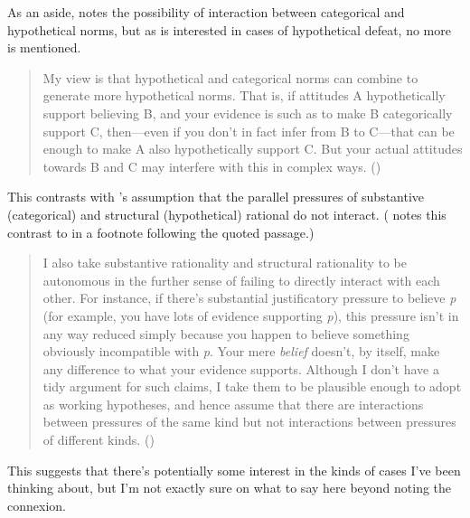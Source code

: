 \documentclass[10pt]{article}
\begin{document}
\begin{note}
As an aside, \citeauthor{Pryor:2018aa} notes the possibility of interaction between categorical and hypothetical norms, but as \citeauthor{Pryor:2018aa} is interested in cases of hypothetical defeat, no more is mentioned.

\begin{quote}
  My view is that hypothetical and categorical norms can combine to generate more hypothetical norms.
  That is, if attitudes A hypothetically support believing B, and your evidence is such as to make B categorically support C, then---even if you don't in fact infer from B to C---that can be enough to make A also hypothetically support C.
  But your actual attitudes towards B and C may interfere with this in complex ways.\nolinebreak
  \mbox{}\hfill\mbox{(\citeyear[128]{Pryor:2018aa})}
\end{quote}

This contrasts with \citeauthor{Fogal:2019aa}'s assumption that the parallel pressures of substantive (categorical) and structural (hypothetical) rational do not interact.
(\citeauthor{Fogal:2019aa} notes this contrast to \citeauthor{Pryor:2018aa} in a footnote following the quoted passage.)

\begin{quote}
  I also take substantive rationality and structural rationality to be autonomous in the further sense of failing to directly interact with each other.
  For instance, if there’s substantial justificatory pressure to believe \emph{p} (for example, you have lots of evidence supporting \emph{p}), this pressure isn't in any way reduced simply because you happen to believe something obviously incompatible with \emph{p}.
  Your mere \emph{belief} doesn't, by itself, make any difference to what your evidence supports.
  Although I don’t have a tidy argument for such claims, I take them to be plausible enough to adopt as working hypotheses, and hence assume that there are interactions between pressures of the same kind but not interactions between pressures of different kinds.\nolinebreak
  \mbox{}\hfill\mbox{(\citeauthor[27]{Fogal:2019aa})}
\end{quote}

This suggests that there's potentially some interest in the kinds of cases I've been thinking about, but I'm not exactly sure on what to say here beyond noting the connexion.
\end{note}
\end{document}

